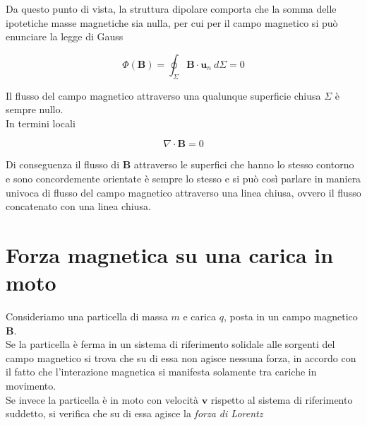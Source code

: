 Da questo punto di vista, la struttura dipolare comporta che la somma delle ipotetiche masse magnetiche sia nulla, per cui per il campo magnetico si può enunciare la legge di Gauss 

\begin{tcolorbox}[colback=yellow!10!white, colframe=orange!70!black, boxrule=0.8pt]
\begin{equation}
    \Phi (\mathbf{B}) = \oint_{\Sigma} \mathbf{B} \cdot \mathbf{u}_n \ d \Sigma = 0
\end{equation}
\end{tcolorbox}

Il flusso del campo magnetico attraverso una qualunque superficie chiusa $\Sigma$ è sempre nullo. \\

In termini locali 

\begin{tcolorbox}[colback=yellow!10!white, colframe=orange!70!black, boxrule=0.8pt]
\begin{equation}
    \nabla \cdot \mathbf{B} = 0
\end{equation}
\end{tcolorbox}

Di conseguenza il flusso di $\mathbf{B}$ attraverso le superfici che hanno lo stesso contorno e sono concordemente orientate è sempre lo stesso e si può così parlare in maniera univoca di flusso del campo magnetico attraverso una linea chiusa, ovvero il flusso concatenato con una linea chiusa. 

\section{Forza magnetica su una carica in moto}

Consideriamo una particella di massa $m$ e carica $q$, posta in un campo magnetico $\mathbf{B}$. \\

Se la particella è ferma in un sistema di riferimento solidale alle sorgenti del campo magnetico si trova che su di essa non agisce nessuna forza, in accordo con il fatto che l'interazione magnetica si manifesta solamente tra cariche in movimento. \\

Se invece la particella è in moto con velocità $\mathbf{v}$ rispetto al sistema di riferimento suddetto, si verifica che su di essa agisce la \emph{forza di Lorentz} 

